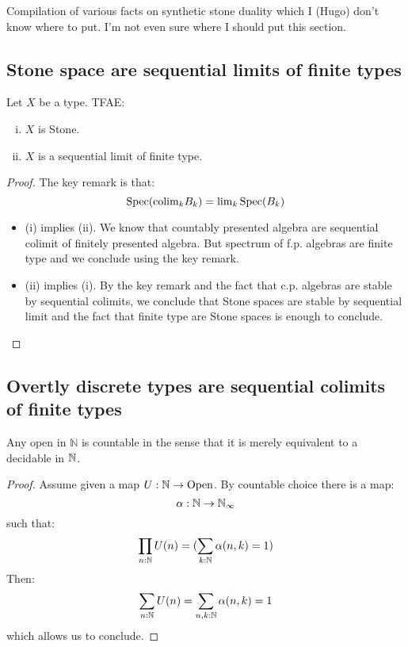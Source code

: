 Compilation of various facts on synthetic stone duality which I (Hugo) don't know where to put. I'm not even sure where I should put this section.


\subsection{Stone space are sequential limits of finite types}

\begin{lemma}
Let $X$ be a type. TFAE:
\begin{enumerate}[(i)]
\item $X$ is Stone.
\item $X$ is a sequential limit of finite type.
\end{enumerate}
\end{lemma}

\begin{proof}
The key remark is that:
\[\operatorname{Spec}(\mathrm{colim}_kB_k) = \mathrm{lim}_k\operatorname{Spec}(B_k)\]
\begin{itemize}
\item (i) implies (ii). We know that countably presented algebra are sequential colimit of finitely presented algebra. But spectrum of f.p. algebras are finite type and we conclude using the key remark.
\item (ii) implies (i). By the key remark and the fact that c.p. algebras are stable by sequential colimits, we conclude that Stone spaces are stable by sequential limit and the fact that finite type are Stone spaces is enough to conclude.
\end{itemize}
\end{proof}


\subsection{Overtly discrete types are sequential colimits of finite types}

\begin{lemma}\label{open-in-N-pseudo-countable}
Any open in $\mathbb{N}$ is countable in the sense that it is merely equivalent to a decidable in $\mathbb{N}$.
\end{lemma}

\begin{proof}
Assume given a map $U:\mathbb{N}\to\mathrm{Open}$. By countable choice there is a map:
\[\alpha:\mathbb{N}\to \mathbb{N}_\infty\]
such that:
\[\prod_{n:\mathbb{N}} U(n) = (\sum_{k:\mathbb{N}} \alpha(n,k) = 1)\]
Then:
\[\sum_{n:\mathbb{N}}U(n) = \sum_{n,k:\mathbb{N}}\alpha(n,k) = 1\]
which allows us to conclude.
\end{proof}

